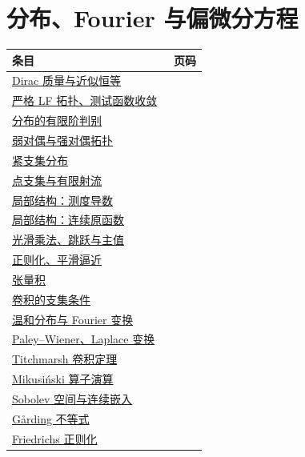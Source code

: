 \section*{分布、Fourier 与偏微分方程}
\begin{longtable}{p{0.80\linewidth}r}
\toprule 条目 & 页码\\\midrule\endhead
\hyperref[prop:delta-approx]{Dirac 质量与近似恒等} & \pageref{prop:delta-approx}\\
\hyperref[thm:D-convergence]{严格 LF 拓扑、测试函数收敛} & \pageref{thm:D-convergence}\\
\hyperref[thm:finite-order]{分布的有限阶判别} & \pageref{thm:finite-order}\\
\hyperref[ch:distributions]{弱对偶与强对偶拓扑} & \pageref{ch:distributions}\\
\hyperref[thm:Eprime]{紧支集分布} & \pageref{thm:Eprime}\\
\hyperref[thm:point-support]{点支集与有限射流} & \pageref{thm:point-support}\\
\hyperref[prop:measure-structure]{局部结构：测度导数} & \pageref{prop:measure-structure}\\
\hyperref[cor:y3-continuous-primitive]{局部结构：连续原函数} & \pageref{cor:y3-continuous-primitive}\\
\hyperref[ch:operations]{光滑乘法、跳跃与主值} & \pageref{ch:operations}\\
\hyperref[thm:mollification]{正则化、平滑逼近} & \pageref{thm:mollification}\\
\hyperref[ch:convolution]{张量积} & \pageref{ch:convolution}\\
\hyperref[thm:compact-convolution]{卷积的支集条件} & \pageref{thm:compact-convolution}\\
\hyperref[ch:fourier]{温和分布与 Fourier 变换} & \pageref{ch:fourier}\\
\hyperref[sec:yosida-06-04]{Paley--Wiener、Laplace 变换} & \pageref{sec:yosida-06-04}\\
\hyperref[sec:yosida-06-05]{Titchmarsh 卷积定理} & \pageref{sec:yosida-06-05}\\
\hyperref[sec:yosida-06-06]{Mikusiński 算子演算} & \pageref{sec:yosida-06-06}\\
\hyperref[prop:topic-sobolev-embedding]{Sobolev 空间与连续嵌入} & \pageref{prop:topic-sobolev-embedding}\\
\hyperref[sec:yosida-06-08]{Gårding 不等式} & \pageref{sec:yosida-06-08}\\
\hyperref[sec:yosida-06-09]{Friedrichs 正则化} & \pageref{sec:yosida-06-09}\\

\end{longtable}
